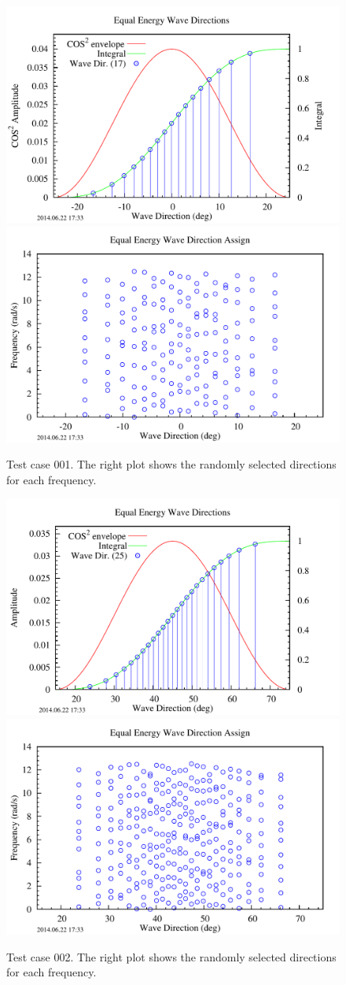 \begin{figure}
   \centering
   \includegraphics[width=.47\linewidth]{chaps/figures/WaveDirTest/WavesTest_001--equal_energy_disc.pdf}
   \includegraphics[width=.47\linewidth]{chaps/figures/WaveDirTest/WavesTest_001--wavedir_assign.pdf}
   \caption{Test case 001.  The right plot shows the randomly selected directions for each frequency.\label{fig:MultiDir:WavesTest001}}
\end{figure}

\begin{figure}
   \centering
   \includegraphics[width=.47\linewidth]{chaps/figures/WaveDirTest/WavesTest_002--equal_energy_disc.pdf}
   \includegraphics[width=.47\linewidth]{chaps/figures/WaveDirTest/WavesTest_002--wavedir_assign.pdf}
   \caption{Test case 002.  The right plot shows the randomly selected directions for each frequency.\label{fig:MultiDir:WavesTest002}}
\end{figure}

